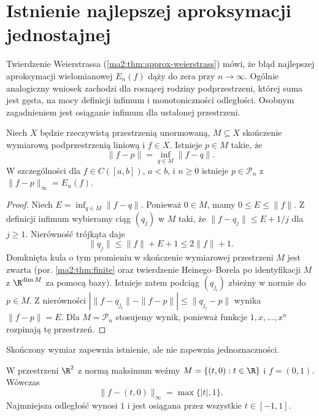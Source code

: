 \section{Istnienie najlepszej aproksymacji jednostajnej}

Twierdzenie Weierstrassa (\ref{ma2:thm:approx-weierstrass})
mówi, że błąd najlepszej aproksymacji wielomianowej
$E_n(f)$ dąży do zera przy $n\to\infty$. Ogólnie
analogiczny wniosek zachodzi dla rosnącej rodziny
podprzestrzeni, której suma jest gęsta, na mocy
definicji infimum i monotoniczności odległości. Osobnym zagadnieniem
jest osiąganie infimum dla ustalonej przestrzeni.

\begin{twierdzenie}
\label{ma2:thm:approx-existence}
Niech $X$ będzie rzeczywistą przestrzenią unormowaną,
$M\subseteq X$ skończenie wymiarową podprzestrzenią
liniową i $f\in X$. Istnieje $p\in M$ takie, że
\[
 \|f-p\|=\inf_{q\in M}\|f-q\|.
\]
W szczególności dla $f\in C([a,b])$, $a<b$,
i $n\ge0$ istnieje $p\in\mathcal P_n$
z $\|f-p\|_\infty=E_n(f)$.
\end{twierdzenie}
\begin{proof}
Niech $E=\inf_{q\in M}\|f-q\|$.
Ponieważ $0\in M$, mamy $0\le E\le\|f\|$.
Z definicji infimum wybieramy ciąg $(q_j)$ w $M$
taki, że $\|f-q_j\|\le E+1/j$ dla $j\ge1$.
Nierówność trójkąta daje
\[
 \|q_j\|\le\|f\|+E+1\le 2\|f\|+1.
\]
Domknięta kula o tym promieniu w skończenie
wymiarowej przestrzeni $M$ jest zwarta
(por. \ref{ma2:thm:finite} oraz twierdzenie
Heinego--Borela po identyfikacji $M$ z
$\R^{\dim M}$ za pomocą bazy).
Istnieje zatem podciąg $(q_{j_l})$ zbieżny
w normie do $p\in M$.
Z nierówności
$|\|f-q_{j_l}\|-\|f-p\||\le\|q_{j_l}-p\|$
wynika $\|f-p\|=E$.
Dla $M=\mathcal P_n$ stosujemy wynik, ponieważ
funkcje $1,x,\ldots,x^n$ rozpinają tę przestrzeń.
\end{proof}

Skończony wymiar zapewnia istnienie,
ale nie zapewnia jednoznaczności.

\begin{przyklad}
\label{ma2:ex:approx-nonunique}
W przestrzeni $\R^2$ z normą maksimum
weźmy $M=\{(t,0):t\in\R\}$ i $f=(0,1)$.
Wówczas
\[
 \|f-(t,0)\|_\infty=\max\{|t|,1\}.
\]
Najmniejsza odległość wynosi $1$ i jest
osiągana przez wszystkie $t\in[-1,1]$.
\end{przyklad}

